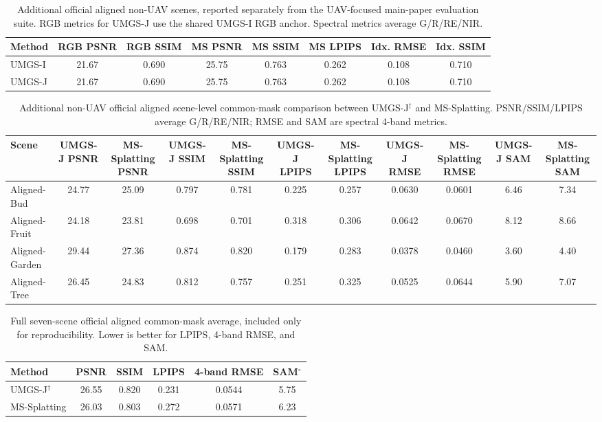﻿%
\begin{table}[t]
    \caption{Additional official aligned non-UAV scenes, reported separately from the UAV-focused main-paper evaluation suite. RGB metrics for UMGS-J use the shared UMGS-I RGB anchor. Spectral metrics average G/R/RE/NIR.}
    \label{tab:supp-nonuav-main}
    \centering
    \tiny
    \setlength{\tabcolsep}{2pt}
    \begin{tabular}{lccccccc}
        \toprule
        Method & RGB PSNR & RGB SSIM & MS PSNR & MS SSIM & MS LPIPS & Idx. RMSE & Idx. SSIM \\
        \midrule
        UMGS-I & 21.67 & 0.690 & 25.75 & 0.763 & 0.262 & 0.108 & 0.710 \\
        UMGS-J & 21.67 & 0.690 & 25.75 & 0.763 & 0.262 & 0.108 & 0.710 \\
        \bottomrule
    \end{tabular}
\end{table}

\begin{table}[t]
    \caption{Additional non-UAV official aligned scene-level common-mask comparison between UMGS-J$^\dagger$ and MS-Splatting. PSNR/SSIM/LPIPS average G/R/RE/NIR; RMSE and SAM are spectral 4-band metrics.}
    \label{tab:supp-umgsj-mms-scenes}
    \centering
    \tiny
    \setlength{\tabcolsep}{2pt}
    \begin{tabular}{lcccccccccc}
        \toprule
        Scene & UMGS-J PSNR & MS-Splatting PSNR & UMGS-J SSIM & MS-Splatting SSIM & UMGS-J LPIPS & MS-Splatting LPIPS & UMGS-J RMSE & MS-Splatting RMSE & UMGS-J SAM & MS-Splatting SAM \\
        \midrule
        Aligned-Bud & 24.77 & 25.09 & 0.797 & 0.781 & 0.225 & 0.257 & 0.0630 & 0.0601 & 6.46 & 7.34 \\
        Aligned-Fruit & 24.18 & 23.81 & 0.698 & 0.701 & 0.318 & 0.306 & 0.0642 & 0.0670 & 8.12 & 8.66 \\
        Aligned-Garden & 29.44 & 27.36 & 0.874 & 0.820 & 0.179 & 0.283 & 0.0378 & 0.0460 & 3.60 & 4.40 \\
        Aligned-Tree & 26.45 & 24.83 & 0.812 & 0.757 & 0.251 & 0.325 & 0.0525 & 0.0644 & 5.90 & 7.07 \\
        \bottomrule
    \end{tabular}
\end{table}

\begin{table}[t]
    \caption{Full seven-scene official aligned common-mask average, included only for reproducibility. Lower is better for LPIPS, 4-band RMSE, and SAM.}
    \label{tab:supp-official7-mms-summary}
    \centering
    \scriptsize
    \begin{tabular}{lccccc}
        \toprule
        Method & PSNR & SSIM & LPIPS & 4-band RMSE & SAM$^\circ$ \\
        \midrule
        UMGS-J$^\dagger$ & 26.55 & 0.820 & 0.231 & 0.0544 & 5.75 \\
        MS-Splatting & 26.03 & 0.803 & 0.272 & 0.0571 & 6.23 \\
        \bottomrule
    \end{tabular}
\end{table}

